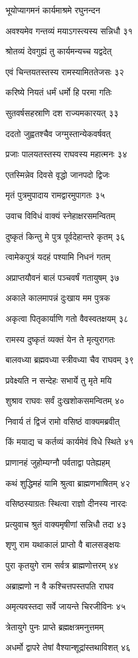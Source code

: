भूयोप्यागमनं कार्यमाश्रमे रघुनन्दन

अवश्यमेव गन्तव्यं मयाऽगस्त्यस्य सन्निधौ ३१

श्रोतव्यं देवगुह्यं तु कार्यमन्यच्च यद्वदेत्

एवं चिन्तयतस्तस्य रामस्यामिततेजसः ३२

करिष्ये नियतं धर्मं धर्मो हि परमा गतिः

सुतवर्षसहस्राणि दश राज्यमकारयत् ३३

ददतो जुह्वतश्चैव जग्मुस्तान्येकवर्षवत्

प्रजाः पालयतस्तस्य राघवस्य महात्मनः ३४

एतस्मिन्नेव दिवसे वृद्धो जानपदो द्विजः

मृतं पुत्रमुपादाय रामद्वारमुपागतः ३५

उवाच विविधं वाक्यं स्नेहाक्षरसमन्वितम्

दुष्कृतं किन्तु मे पुत्र पूर्वदेहान्तरे कृतम् ३६

त्वामेकपुत्रं यदहं पश्यामि निधनं गतम्

अप्राप्तयौवनं बालं पञ्चवर्षं गतायुषम् ३७

अकाले कालमापन्नं दुःखाय मम पुत्रक

अकृत्वा पितृकार्याणि गतो वैवस्वतक्षयम् ३८

रामस्य दुष्कृतं व्यक्तं येन ते मृत्युरागतः

बालवध्या ब्रह्मवध्या स्त्रीवध्या चैव राघवम् ३९

प्रवेक्ष्यति न सन्देहः सभार्ये तु मृते मयि

शुश्राव राघवः सर्वं दुःखशोकसमन्वितम् ४०

निवार्य तं द्विजं रामो वसिष्ठं वाक्यमब्रवीत्

किं मयाद्य च कर्तव्यं कार्यमेवं विधे स्थिते ४१

प्राणानहं जुहोम्यग्नौ पर्वताद्वा पतेह्यहम्

कथं शुद्धिमहं यामि श्रुत्वा ब्राह्मणभाषितम् ४२

वसिष्ठस्याग्रतः स्थित्वा राज्ञो दीनस्य नारदः

प्रत्युवाच श्रुतं वाक्यमृषीणां सन्निधौ तदा ४३

शृणु राम यथाकालं प्राप्तो वै बालसङ्क्षयः

पुरा कृतयुगे राम सर्वत्र ब्राह्मणोत्तरम् ४४

अब्राह्मणो न वै कश्चित्तपस्तपति राघव

अमृत्यवस्तदा सर्वे जायन्ते चिरजीविनः ४५

त्रेतायुगे पुनः प्राप्ते ब्रह्मक्षत्रमनुत्तमम्

अधर्मो द्वापरे तेषां वैश्यान्शूद्रांस्तथाविशत् ४६

